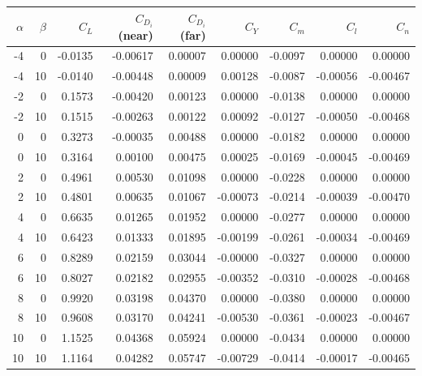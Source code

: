 \begin{tabular}{rrrrrrrrr}
  \hline
  $\alpha$ & $\beta$ & $C_L$ & $C_{D_i}$(near) & $C_{D_i}$(far) & $C_Y$ & $C_m$ & $C_l$ & $C_n$ \\
  \hline
     -4 &     0 & -0.0135 & -0.00617 & 0.00007 & 0.00000 & -0.0097 & 0.00000 & 0.00000 \\
     -4 &    10 & -0.0140 & -0.00448 & 0.00009 & 0.00128 & -0.0087 & -0.00056 & -0.00467 \\
     -2 &     0 & 0.1573 & -0.00420 & 0.00123 & 0.00000 & -0.0138 & 0.00000 & 0.00000 \\
     -2 &    10 & 0.1515 & -0.00263 & 0.00122 & 0.00092 & -0.0127 & -0.00050 & -0.00468 \\
      0 &     0 & 0.3273 & -0.00035 & 0.00488 & 0.00000 & -0.0182 & 0.00000 & 0.00000 \\
      0 &    10 & 0.3164 & 0.00100 & 0.00475 & 0.00025 & -0.0169 & -0.00045 & -0.00469 \\
      2 &     0 & 0.4961 & 0.00530 & 0.01098 & 0.00000 & -0.0228 & 0.00000 & 0.00000 \\
      2 &    10 & 0.4801 & 0.00635 & 0.01067 & -0.00073 & -0.0214 & -0.00039 & -0.00470 \\
      4 &     0 & 0.6635 & 0.01265 & 0.01952 & 0.00000 & -0.0277 & 0.00000 & 0.00000 \\
      4 &    10 & 0.6423 & 0.01333 & 0.01895 & -0.00199 & -0.0261 & -0.00034 & -0.00469 \\
      6 &     0 & 0.8289 & 0.02159 & 0.03044 & -0.00000 & -0.0327 & 0.00000 & 0.00000 \\
      6 &    10 & 0.8027 & 0.02182 & 0.02955 & -0.00352 & -0.0310 & -0.00028 & -0.00468 \\
      8 &     0 & 0.9920 & 0.03198 & 0.04370 & 0.00000 & -0.0380 & 0.00000 & 0.00000 \\
      8 &    10 & 0.9608 & 0.03170 & 0.04241 & -0.00530 & -0.0361 & -0.00023 & -0.00467 \\
     10 &     0 & 1.1525 & 0.04368 & 0.05924 & 0.00000 & -0.0434 & 0.00000 & 0.00000 \\
     10 &    10 & 1.1164 & 0.04282 & 0.05747 & -0.00729 & -0.0414 & -0.00017 & -0.00465 \\
  \hline
\end{tabular}
